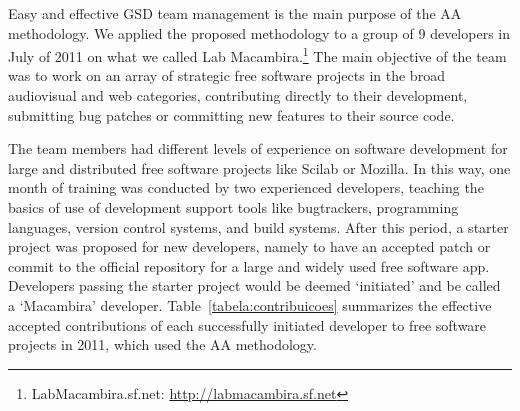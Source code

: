\documentclass{article}
\begin{document}
Easy and effective GSD team management is the main
purpose of the AA methodology. We applied the proposed methodology to a group
of 9 developers in July of 2011 on what we called Lab
Macambira.\footnote{LabMacambira.sf.net: \url{http://labmacambira.sf.net}} The
main objective of the team was to work on an array of strategic free software
projects in the broad audiovisual and web categories,
contributing directly to their development, submitting bug patches or
committing new features to their source code.

The team members had different levels of experience on software
development for large and distributed free software projects
like Scilab or Mozilla. In this way, one month of training was
conducted by two experienced developers, teaching the basics of use of
development support tools like bugtrackers, programming languages,
version control systems, and build systems. After this period, a starter project
was proposed for new developers, namely to have an accepted patch or commit to
the official repository for a large and widely used free software app.
Developers passing the starter project would be deemed `initiated' and be
called a `Macambira' developer.  Table~\ref{tabela:contribuicoes} summarizes the
effective accepted contributions of each successfully initiated developer to
free software projects in 2011, which used the AA methodology.

\end{document}
